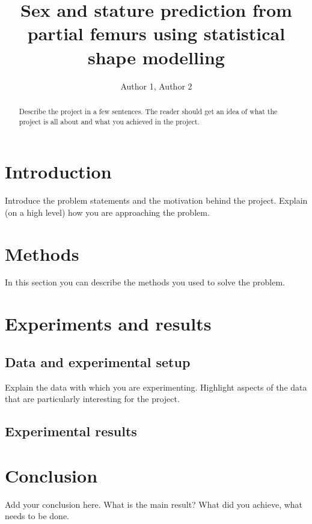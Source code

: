 \documentclass[10pt]{article}
\author{Author 1, Author 2}
\title{Sex and stature prediction from partial femurs using statistical shape modelling}
\begin{document}
\maketitle
\begin{abstract}
    Describe the project in a few sentences. 
    The reader should get an idea of what the project is all about
   and what you achieved in the project.
\end{abstract}

\section{Introduction}

Introduce the problem statements and the motivation behind the project.
Explain (on a high level) how you are approaching the problem. 

\section{Methods}

In this section you can describe the methods you used to solve the problem.


\section{Experiments and results}

\subsection{Data and experimental setup}

Explain the data with which you are experimenting.
Highlight aspects of the data that are particularly interesting 
for the project. 

\subsection{Experimental results}


\section{Conclusion}

Add your conclusion here. What is the main result? What did you achieve, what 
needs to be done. 
\end{document}
